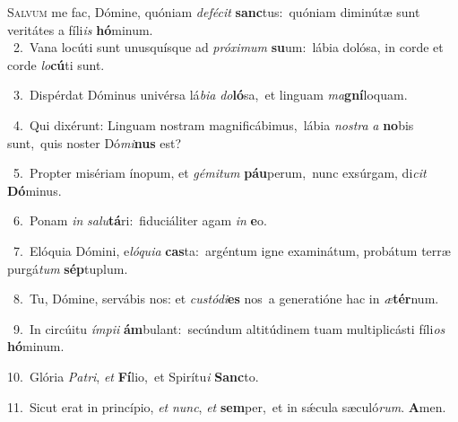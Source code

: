\lettrine{\initial\textcolor{\initialcolor}{S}}{alvum} me fac, Dómine, quóniam \textit{de}\-\textit{fé}\textit{cit} \textbf{sanc}\-tus:~\star quóniam diminútæ sunt veritátes a fíli\textit{is} \textbf{hó}\-minum.\\
{\numbfont\textcolor{\numbcolor}{~2.}}~Vana locúti sunt unusquísque ad \textit{pró}\-\textit{xi}\textit{mum} \textbf{su}\-um:~\star lábia dolósa, in corde et corde \textit{lo}\-\textbf{cú}ti sunt.\par
{\numbfont\textcolor{\numbcolor}{~3.}}~Dispérdat Dóminus univérsa lá\-\textit{bi}\-\textit{a} \textit{do}\-\textbf{ló}sa,~\star et linguam \textit{ma}\-\textbf{gní}loquam.\par
{\numbfont\textcolor{\numbcolor}{~4.}}~Qui dixérunt: Linguam nostram magnificábimus,~\dagger lábia \textit{nos}\-\textit{tra} \textit{a} \textbf{no}\-bis sunt,~\star quis noster Dó\-\textit{mi}\-\textbf{nus} est?\par
{\numbfont\textcolor{\numbcolor}{~5.}}~Propter misériam ínopum, et \textit{gé}\-\textit{mi}\textit{tum} \textbf{páu}\-perum,~\star nunc exsúrgam, di\textit{cit} \textbf{Dó}\-minus.\par
{\numbfont\textcolor{\numbcolor}{~6.}}~Ponam \textit{in} \textit{sa}\-\textit{lu}\textbf{tá}ri:~\star fiduciáliter agam \textit{in} \textbf{e}\-o.\par
{\numbfont\textcolor{\numbcolor}{~7.}}~Elóquia Dómini, e\-\textit{ló}\-\textit{qui}\textit{a} \textbf{cas}\-ta:~\star argéntum igne examinátum, probátum terræ purgá\textit{tum} \textbf{sép}\-tuplum.\par
{\numbfont\textcolor{\numbcolor}{~8.}}~Tu, Dómine, servábis nos: et \textit{cus}\-\textit{tó}\textit{di}\textbf{es} nos~\star a generatióne hac in \textit{æ}\-\textbf{tér}num.\par
{\numbfont\textcolor{\numbcolor}{~9.}}~In circúitu \textit{ím}\-\textit{pi}\textit{i} \textbf{ám}\-bulant:~\star secúndum altitúdinem tuam multiplicásti fíli\textit{os} \textbf{hó}\-minum.\par
{\numbfont\textcolor{\numbcolor}{10.}}~Glória \textit{Pa}\-\textit{tri}, \textit{et} \textbf{Fí}\-lio,~\star et Spirítu\textit{i} \textbf{Sanc}\-to.\par
{\numbfont\textcolor{\numbcolor}{11.}}~Sicut erat in princípio, \textit{et} \textit{nunc}\-, \textit{et} \textbf{sem}\-per,~\star et in sǽcula sæculó\-\textit{rum}\-. \textbf{A}\-men.\par
